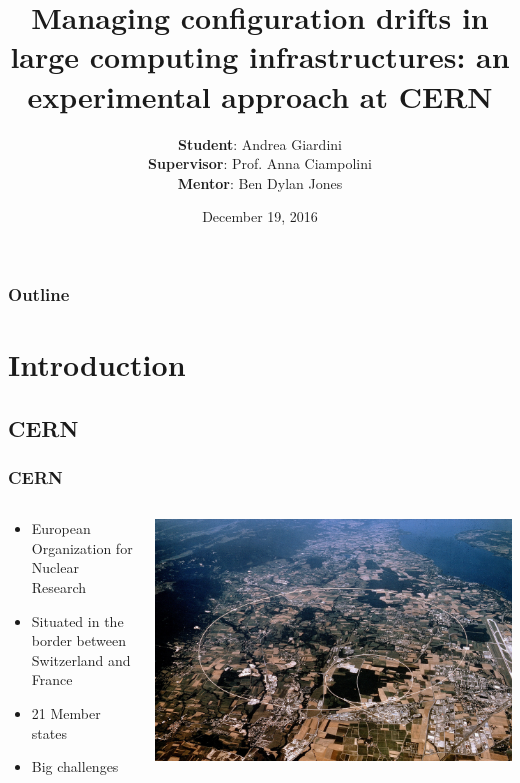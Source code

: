 \documentclass[aspectratio=169]{beamer}
\title{Managing configuration drifts in large computing infrastructures:
an experimental approach at CERN}
\author{ \vspace{20px}
    \textbf{Student}: \hspace{7px} Andrea Giardini \\
    \textbf{Supervisor}: Prof. Anna Ciampolini \\
    \textbf{Mentor}: \hspace{9px} Ben Dylan Jones \\}
\institute{University of Bologna}
\date{December 19, 2016}
\begin{document}
\begin{frame}
\titlepage
\end{frame}

\begin{frame}
\frametitle{Outline}
\vspace{10px}
\tableofcontents
\end{frame}


\section{Introduction}

\subsection{CERN}
\begin{frame}
    \frametitle{CERN}
    \begin{minipage}[t]{0.95\textwidth}
        \begin{columns}
            \begin{column}{0.5\textwidth}
                \begin{itemize}
                    \item European Organization for Nuclear Research
                    \item Situated in the border between Switzerland and France
                    \item 21 Member states
                    \item Big challenges 
                \end{itemize}
            \end{column}
            \begin{column}{0.5\textwidth}
                \includegraphics[width=1.1\textwidth]{CernMap.jpg}
            \end{column}
        \end{columns}
    \end{minipage}
\end{frame}
\end{document}
